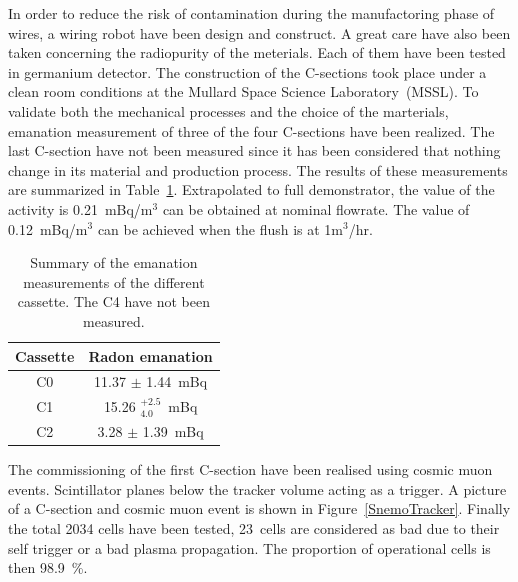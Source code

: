 \documentclass[main.tex]{subfiles}
\begin{document}
 


\bigskip


\NI In order to reduce the risk of contamination during the manufactoring phase of wires, a wiring robot have been design and construct. A great care have also been taken concerning the radiopurity of the meterials. Each of them have been tested in germanium detector. The construction of the C-sections took place under a clean room conditions at the Mullard Space Science Laboratory~(MSSL). To validate both the mechanical processes and the choice of the marterials, emanation measurement of three of the four C-sections have been realized. The last C-section have not been measured since it has been considered that nothing change in its material and production process. The results of these measurements are summarized in Table~\ref{tab:RadonEmanation}. Extrapolated to full demonstrator, the value of the activity is 0.21~mBq/m$^{\text{3}}$ can be obtained at nominal flowrate. The value of 0.12~mBq/m$^{\text{3}}$ can be achieved when the flush is at 1m$^{\text{3}}$/hr.


\begin{table}[h!]
\centering
\begin{tabular}{c|c}
Cassette & Radon emanation \\
\toprule
C0 & 11.37 $\pm$ 1.44~mBq \\
C1 & 15.26 $^{+\text{2.5}}_{\text{4.0}}$~mBq \\
C2 & 3.28 $\pm$ 1.39~mBq \\
\bottomrule
\end{tabular}
\caption{Summary of the emanation measurements of the different cassette. The C4 have not been measured.}
\label{tab:RadonEmanation}
\end{table}


\bigskip


\NI The commissioning of the first C-section have been realised using cosmic muon events. Scintillator planes below the tracker volume acting as a trigger. A picture of a C-section and cosmic muon event is shown in Figure~\ref{SnemoTracker}. Finally the total 2034 cells have been tested, 23~cells are considered as bad due to their self trigger or a bad plasma propagation. The proportion of operational cells is then 98.9~\%. 
\end{document}
